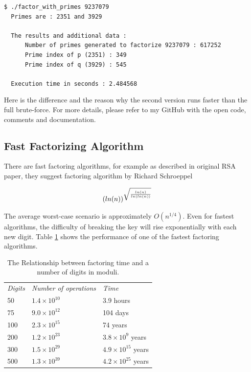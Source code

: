 \documentclass[a4paper, 12pt]{article}
\begin{document}
\begin{lstlisting}[caption=Demonstration of Prime Factorization with Primes]
  $ ./factor_with_primes 9237079
  Primes are : 2351 and 3929

  The results and additional data :
      Number of primes generated to factorize 9237079 : 617252
      Prime index of p (2351) : 349
      Prime index of q (3929) : 545
      
  Execution time in seconds : 2.484568
  \end{lstlisting}

Here is the difference and the reason why the second version runs faster than the full brute-force.
For more details, please refer to my GitHub with the open code, comments and documentation. \\

\subsection{Fast Factorizing Algorithm}
\label{bsec:fast}

There are fast factoring algorithms, for example as described in original RSA paper\cite{rsapaper},
they suggest factoring algorithm by Richard Schroeppel

\begin{equation}
  (ln(n))^{\sqrt{\frac{ln(n)}{ln(ln(n))}}}\\
  \end{equation}

The average worst-case scenario is approximately $O(n^{1/4})$. Even for fastest algorithms, the difficulty
of breaking the key will rise exponentially with each new digit. Table \ref{table:rsa} shows the performance
of one of the fastest factoring algorithms.\\

\begin{table}
  \begin{center}
      \caption{The Relationship between factoring time and a number of digits in moduli.\cite{rsapaper}}
    \begin{tabular}{l l l}
    \textit{Digits} & \textit{Number of operations} & \textit{Time}\\
    50 & $1.4 \times 10^{10}$ & 3.9 hours\\
    75 & $9.0 \times 10^{12}$ & 104 days\\
    100 & $2.3 \times 10^{15}$ & 74 years\\
    200 & $1.2 \times 10^{23}$ & $3.8 \times 10^9$ years\\
    300 & $1.5 \times 10^{29}$ & $4.9 \times 10^{15}$ years\\
    500 & $1.3 \times 10^{39}$ & $4.2 \times 10^{25}$ years\\
    \end{tabular}
  \label{table:rsa}
  \end{center}
  \end{table}
\end{document}

